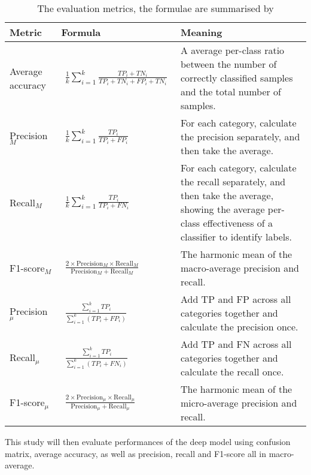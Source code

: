 \begin{table}[!htbp]
\renewcommand{\arraystretch}{1.8}
\centering
\begin{tabularx}{\textwidth}{p{.12\linewidth}|>{\centering\arraybackslash}m{.3\linewidth}X}
\hline
Metric & Formula & Meaning \\
\hline
Average accuracy & \vspace{1em}$\begin{aligned}\frac{1}{k}\sum_{i=1}^{k} \frac{TP_{i}+TN_{i}}{TP_{i}+TN_{i}+FP_{i}+TN_{i}}\end{aligned}$ & A average per-class ratio between the number of correctly classified samples and the total number of samples. \\
Precision$_M$ & $\begin{aligned}\frac{1}{k}\sum_{i=1}^{k} \frac{TP_{i}}{TP_{i}+FP_{i}}\end{aligned}$ & For each category, calculate the precision separately, and then take the average. \\
Recall$_M$ & $\begin{aligned}\frac{1}{k}\sum_{i=1}^{k} \frac{TP_{i}}{TP_{i}+FN_{i}}\end{aligned}$ & For each category, calculate the recall separately, and then take the average, showing the average per-class effectiveness of a classifier to identify labels. \\
F1-score$_M$ & $\begin{aligned}\frac{2 \times \text{Precision}_{M} \times \text{Recall}_{M}}{\text {Precision}_{M}+\text{Recall}_{M}}\end{aligned}$ & The harmonic mean of the macro-average precision and recall. \\
Precision$_\mu$ & $\begin{aligned}\frac{\sum_{i=1}^{k} TP_{i}}{\sum_{i=1}^{k}\left(TP_{i}+FP_{i}\right)}\end{aligned}$ & Add TP and FP across all categories together and calculate the precision once. \\
Recall$_\mu$ & $\begin{aligned}\frac{\sum_{i=1}^{k} TP_{i}}{\sum_{i=1}^{k}\left(TP_{i}+FN_{i}\right)}\end{aligned}$ & Add TP and FN across all categories together and calculate the recall once. \\
F1-score$_\mu$ & $\begin{aligned}\frac{2 \times \text{Precision}_{\mu} \times \text{Recall}_{\mu}}{\text {Precision}_{\mu}+\text{Recall}_{\mu}}\end{aligned}$ & The harmonic mean of the micro-average precision and recall. \\
\hline
\end{tabularx}
\caption{The evaluation metrics, the formulae are summarised by \citet{foss2018multiclass}}
\label{tab:The evaluation metrics}
\end{table}

This study will then evaluate performances of the deep model using confusion matrix, average accuracy, as well as precision, recall and F1-score all in macro-average.
